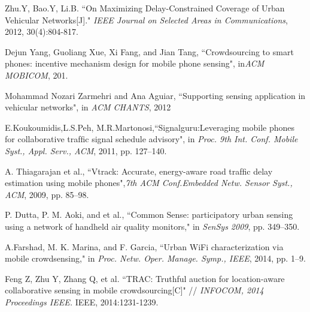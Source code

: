 \documentclass[journal]{IEEEtran}
\begin{document}
%
%
%
\begin{thebibliography}{1}

Zhu.Y, Bao.Y, Li.B. ``On Maximizing Delay-Constrained Coverage of Urban Vehicular Networks[J]." \textit{IEEE Journal on Selected Areas in Communications}, 2012, 30(4):804-817.

Dejun Yang, Guoliang Xue, Xi Fang, and Jian Tang, ``Crowdsourcing to smart phones: incentive mechanism design for mobile phone sensing", in\textit{ACM MOBICOM}, 201. 

Mohammad Nozari Zarmehri and Ana Aguiar, ``Supporting sensing application in vehicular networks", in\textit{ ACM CHANTS}, 2012

E.Koukoumidis,L.S.Peh, M.R.Martonosi,``Signalguru:Leveraging mobile phones for collaborative trafﬁc signal schedule advisory", in \textit{Proc. 9th Int. Conf. Mobile Syst., Appl. Serv., ACM}, 2011, pp. 127–140. 

A. Thiagarajan et al., ``Vtrack: Accurate, energy-aware road trafﬁc delay estimation using mobile phones",\textit{7th ACM Conf.Embedded Netw. Sensor Syst., ACM}, 2009, pp. 85–98.

P. Dutta, P. M. Aoki, and et al., ``Common Sense: participatory urban sensing using a network of handheld air quality monitors," in \textit{SenSys 2009}, pp. 349–350.

A.Farshad, M. K. Marina, and F. Garcia, ``Urban WiFi characterization via mobile crowdsensing," in \textit{Proc. Netw. Oper. Manage. Symp., IEEE}, 2014, pp. 1–9.

Feng Z, Zhu Y, Zhang Q, et al. ``TRAC: Truthful auction for location-aware collaborative sensing in mobile crowdsourcing[C]" // \textit{INFOCOM, 2014 Proceedings IEEE.} IEEE, 2014:1231-1239.


\end{thebibliography}
\end{document}

